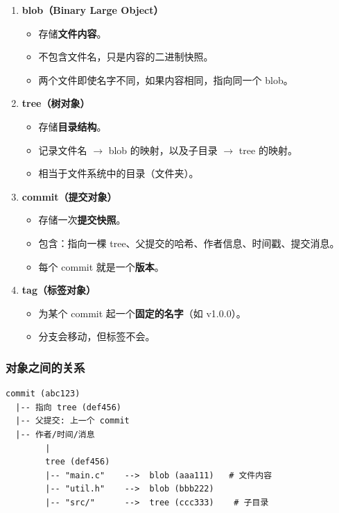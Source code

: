 \documentclass[12pt,a4paper]{article}
\begin{document}
\begin{enumerate}[itemsep=5pt]
    \item \textbf{blob（Binary Large Object）}
    \begin{itemize}
        \item 存储\textbf{文件内容}。
        \item 不包含文件名，只是内容的二进制快照。
        \item 两个文件即使名字不同，如果内容相同，指向同一个 blob。
    \end{itemize}

    \item \textbf{tree（树对象）}
    \begin{itemize}
        \item 存储\textbf{目录结构}。
        \item 记录文件名 $\rightarrow$ blob 的映射，以及子目录 $\rightarrow$ tree 的映射。
        \item 相当于文件系统中的目录（文件夹）。
    \end{itemize}

    \item \textbf{commit（提交对象）}
    \begin{itemize}
        \item 存储一次\textbf{提交快照}。
        \item 包含：指向一棵 tree、父提交的哈希、作者信息、时间戳、提交消息。
        \item 每个 commit 就是一个\textbf{版本}。
    \end{itemize}

    \item \textbf{tag（标签对象）}
    \begin{itemize}
        \item 为某个 commit 起一个\textbf{固定的名字}（如 v1.0.0）。
        \item 分支会移动，但标签不会。
    \end{itemize}
\end{enumerate}

\subsubsection{对象之间的关系}

\begin{lstlisting}[numbers=none]
commit (abc123)
  |-- 指向 tree (def456)
  |-- 父提交: 上一个 commit
  |-- 作者/时间/消息
        |
        tree (def456)
        |-- "main.c"    -->  blob (aaa111)   # 文件内容
        |-- "util.h"    -->  blob (bbb222)
        |-- "src/"      -->  tree (ccc333)    # 子目录
\end{lstlisting}
\end{document}
